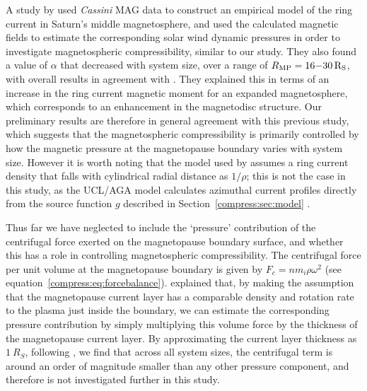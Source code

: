 A study by \citet{bunce2007} used \textit{Cassini} MAG data to construct an empirical model of the ring current in Saturn's middle magnetosphere, and used the calculated magnetic fields to estimate the corresponding solar wind dynamic pressures in order to investigate magnetospheric compressibility, similar to our study. They also found a value of $\alpha$ that decreased with system size, over a range of $R_\mathrm{MP} = 16{\--}\SI{30}{R_S}$, with overall results in agreement with \citet{arridge2006}. They explained this in terms of an increase in the ring current magnetic moment for an expanded magnetosphere, which corresponds to an enhancement in the magnetodisc structure. Our preliminary results are therefore in general agreement with this previous study, which suggests that the magnetospheric compressibility is primarily controlled by how the magnetic pressure at the magnetopause boundary varies with system size. However it is worth noting that the model used by \citet{bunce2007} assumes a ring current density that falls with cylindrical radial distance as $1/\rho$; this is not the case in this study, as the UCL/AGA model calculates azimuthal current profiles directly from the source function $g$ described in Section~\ref{compress:sec:model} \cite[see][]{caudal1986, achilleos2010a}.

Thus far we have neglected to include the `pressure' contribution of the centrifugal force exerted on the magnetopause boundary surface, and whether this has a role in controlling magnetospheric compressibility. The centrifugal force per unit volume at the magnetopause boundary is given by $F_c = nm_i\rho\omega^2$ (see equation~\ref{compress:eq:forcebalance}). \citet{pilkington2014} explained that, by making the assumption that the magnetopause current layer has a comparable density and rotation rate to the plasma just inside the boundary, we can estimate the corresponding pressure contribution by simply multiplying this volume force by the thickness of the magnetopause current layer. By approximating the current layer thickness as $\SI{1}{R_S}$, following \citet{masters2011}, we find that across all system sizes, the centrifugal term is around an order of magnitude smaller than any other pressure component, and therefore is not investigated further in this study.

